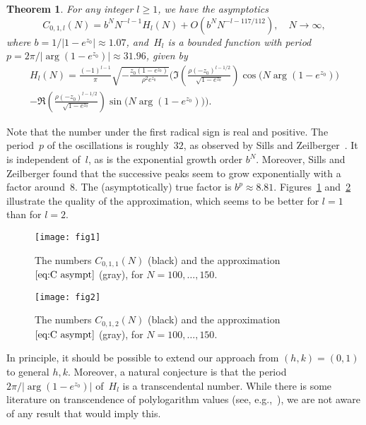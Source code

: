 \documentclass[a4paper]{amsart}
\newtheorem{theorem}{Theorem}
\begin{document}
\begin{theorem}\label{thm:main}
    For any integer $l\geq1$, we have the asymptotics
    \begin{equation}\label{eq:C asympt}
        C_{0,1,l}(N) = b^N N^{-l-1} H_l(N) + O(b^N N^{-l-117/112}), \quad N\to\infty, 
    \end{equation}
    where $b=1/|1-e^{z_0}|\approx 1.07$, and~$H_l$ is a bounded function with period
   $p=2\pi/|\arg(1-e^{z_0})|\approx 31.96$, given by
   \begin{multline*}
       H_l(N) = \frac{(-1)^{l-1}}{\pi} 
       \sqrt{-\frac {z_0(1-e^{z_0})}{\rho^2e^{z_0}}}
       \Bigg(\Im\left( \frac{\rho(-z_0)^{l-1/2}}{\sqrt{1-e^{z_0}}}\right)\cos\big(N \arg(1-e^{z_0})\big) \\
        -\Re\left(\frac{\rho(-z_0)^{l-1/2}}{\sqrt{1-e^{z_0}}}\right)\sin\big(N \arg(1-e^{z_0})\big)\Bigg).
   \end{multline*}
\end{theorem}
%
Note that the number under the first radical sign is real and positive.
The period~$p$
of the oscillations is roughly~$32$, as observed by Sills and
Zeilberger~\cite{SiZe13}. It is independent of~$l$, as is the
exponential growth order $b^N$. Moreover, Sills and Zeilberger
found that the successive peaks seem to grow exponentially with
a factor around~$8$. The (asymptotically) true factor
is $b^p\approx 8.81$.
Figures~\ref{fig:1} and~\ref{fig:2} illustrate the quality of the approximation,
which seems to be better for $l=1$ than for $l=2$.
%
\begin{figure}
\begin{center}
\texttt{[image: fig1]}
\end{center}
\caption{\label{fig:1}The numbers $C_{0,1,1}(N)$ (black)
and the approximation~$\eqref{eq:C asympt}$ (gray), for
$N=100,\dots,150$.}
\end{figure}
%
\begin{figure}
\begin{center}
\texttt{[image: fig2]}
\end{center}
\caption{\label{fig:2}The numbers $C_{0,1,2}(N)$ (black)
and the approximation~$\eqref{eq:C asympt}$ (gray), for
$N=100,\dots,150$.}
\end{figure}

In principle, it should be possible to extend our approach
from $(h,k)=(0,1)$ to general $h,k$.
Moreover, a natural conjecture is that the period $2\pi/|\arg(1-e^{z_0})|$
of~$H_l$ is a transcendental number.
While there is some literature on transcendence of polylogarithm values
(see, e.g.,~\cite{Ha93}), we are not aware of any result that would imply this.
\end{document}
